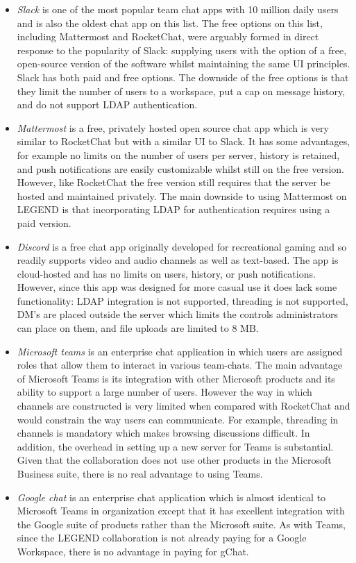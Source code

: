 \documentclass[11pt,letterpaper]{article}
\begin{document}
\begin{itemize}
\item \emph{Slack} is one of the most popular team chat apps with 10 million daily users and is also the oldest chat app on this list. The free options on this list, including Mattermost and RocketChat, were arguably formed in direct response to the popularity of Slack: supplying users with the option of a free, open-source version of the software whilst maintaining the same UI principles. Slack has both paid and free options. The downside of the free options is that they limit the number of users to a workspace, put a cap on message history, and do not support LDAP authentication. 
\item \emph{Mattermost} is a free, privately hosted open source chat app which is very similar to RocketChat but with a similar UI to Slack. It has some advantages, for example no limits on the number of users per server, history is retained, and push notifications are easily customizable whilst still on the free version. However, like RocketChat the free version still requires that the server be hosted and maintained privately. The main downside to using Mattermost on LEGEND is that incorporating LDAP for authentication requires using a paid version. 
\item \emph{Discord} is a free chat app originally developed for recreational gaming and so readily supports video and audio channels as well as text-based. The app is cloud-hosted and has no limits on users, history, or push notifications. However, since this app was designed for more casual use it does lack some functionality: LDAP integration is not supported, threading is not supported, DM's are placed outside the server which limits the controls administrators can place on them, and file uploads are limited to 8 MB.
\item \emph{Microsoft teams} is an enterprise chat application in which users are assigned roles that allow them to interact in various team-chats. The main advantage of Microsoft Teams is its integration with other Microsoft products and its ability to support a large number of users. However the way in which channels are constructed is very limited when compared with RocketChat and would constrain the way users can communicate. For example, threading in channels is mandatory which makes browsing discussions difficult. In addition, the overhead in setting up a new server for Teams is substantial. Given that the collaboration does not use other products in the Microsoft Business suite, there is no real advantage to using Teams. 
\item \emph{Google chat} is an enterprise chat application which is almost identical to Microsoft Teams in organization except that it has excellent integration with the Google suite of products rather than the Microsoft suite. As with Teams, since the LEGEND collaboration is not already paying for a Google Workspace, there is no advantage in paying for gChat. 
\end{itemize}
\end{document}
